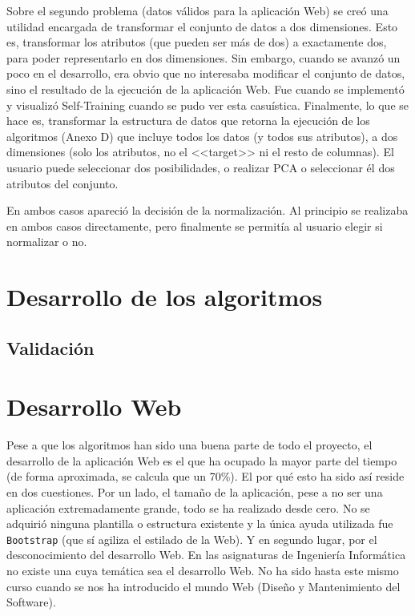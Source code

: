Sobre el segundo problema (datos válidos para la aplicación Web) se creó una
utilidad encargada de transformar el conjunto de datos a dos dimensiones. Esto
es, transformar los atributos (que pueden ser más de dos) a exactamente dos,
para poder representarlo en dos dimensiones. Sin embargo, cuando se avanzó un
poco en el desarrollo, era obvio que no interesaba modificar el conjunto de
datos, sino el resultado de la ejecución de la aplicación Web. Fue cuando se
implementó y visualizó Self-Training cuando se pudo ver esta casuística.
Finalmente, lo que se hace es, transformar la estructura de datos que retorna la
ejecución de los algoritmos (Anexo D) que incluye todos los datos (y todos sus
atributos), a dos dimensiones (solo los atributos, no el <<target>> ni el resto
de columnas). El usuario puede seleccionar dos posibilidades, o realizar PCA o
seleccionar él dos atributos del conjunto.

En ambos casos apareció la decisión de la normalización. Al principio se
realizaba en ambos casos directamente, pero finalmente se permitía al usuario
elegir si normalizar o no.

\section{Desarrollo de los algoritmos}

\subsection{Validación}


\section{Desarrollo Web}

Pese a que los algoritmos han sido una buena parte de todo el proyecto, el
desarrollo de la aplicación Web es el que ha ocupado la mayor parte del tiempo
(de forma aproximada, se calcula que un 70\%). El por qué esto ha sido así
reside en dos cuestiones. Por un lado, el tamaño de la aplicación, pese a no ser
una aplicación extremadamente grande, todo se ha realizado desde cero. No se
adquirió ninguna plantilla o estructura existente y la única ayuda utilizada fue
\texttt{Bootstrap} (que sí agiliza el estilado de la Web). Y en segundo lugar,
por el desconocimiento del desarrollo Web. En las asignaturas de Ingeniería
Informática no existe una cuya temática sea el desarrollo Web. No ha sido hasta
este mismo curso cuando se nos ha introducido el mundo Web (Diseño y
Mantenimiento del Software).

